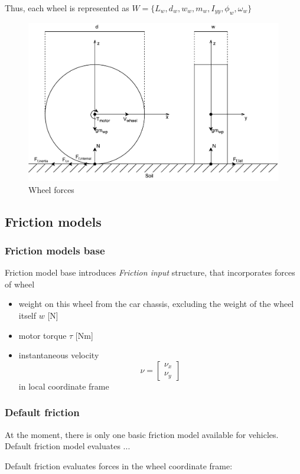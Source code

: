 \documentclass[a4paper,11pt]{article}
\begin{document}
Thus, each wheel is represented as $W = \{L_w, d_w, w_w, m_w, I_{yy}, \phi_w, \omega_w\}$

\begin{figure}[h!]
  \centerline{\includegraphics[width=0.7\linewidth]{imgs/wheel_forces}}
  \caption{Wheel forces}
  \label{fig:wheel_forces}
\end{figure}


\subsection{Friction models} \label{sec:friction_models}
\subsubsection{Friction models base}
Friction model base introduces \textit{Friction input} structure, that incorporates forces of wheel
\begin{itemize}
\item weight on this wheel from the car chassis, excluding the weight of the wheel itself $w$ [N]
\item motor torque $\tau$ [Nm]
\item instantaneous velocity 
\[\nu = \begin{bmatrix}
\nu_x \\
\nu_y
\end{bmatrix}\] in local coordinate frame
\end{itemize}

\subsubsection{Default friction}\label{sec:default_friction}
At the moment, there is only one basic friction model available for vehicles.
Default friction model evaluates ...

Default friction evaluates forces in the wheel coordinate frame:
\end{document}
